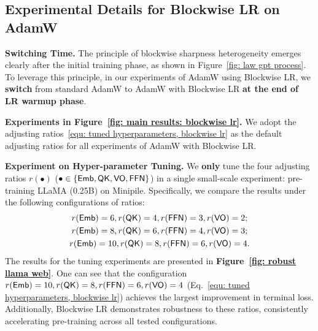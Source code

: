 


\subsection{Experimental Details for Blockwise LR on AdamW}
\label{appendix: experiments, blockwise LR}


{\bf Switching Time.} The principle of blockwise sharpness heterogeneity emerges clearly after the initial training phase, as shown in Figure~\ref{fig: law gpt process}. To leverage this principle, in our experiments of AdamW using Blockwise LR, we {\bf switch} from standard AdamW to AdamW with Blockwise LR {\bf at the end of LR warmup phase}. 


{\bf Experiments in Figure~\ref{fig: main results: blockwise lr}.} We adopt the adjusting ratios~\eqref{equ: tuned hyperparameters, blockwise lr} as the default adjusting ratios for {\bf} all experiments of AdamW with Blockwise LR.


{\bf Experiment on Hyper-parameter Tuning.} We {\bf only} tune the four adjusting ratios $r(\bullet)$ ($\bullet\in\{\textnormal{\textsf{Emb}},\textnormal{\textsf{QK}},\textnormal{\textsf{VO}},\textnormal{\textsf{FFN}}\}$) in a single small-scale experiment: pre-training LLaMA (0.25B) on Minipile. Specifically, we compare the results under the following configurations of ratios:
\begin{gather*}
r(\textnormal{\textsf{Emb}})=6, r(\textnormal{\textsf{QK}})=4, r(\textnormal{\textsf{FFN}})=3, r(\textnormal{\textsf{VO}})=2;\\
r(\textnormal{\textsf{Emb}})=8, r(\textnormal{\textsf{QK}})=6, r(\textnormal{\textsf{FFN}})=4, r(\textnormal{\textsf{VO}})=3;\\
r(\textnormal{\textsf{Emb}})=10, r(\textnormal{\textsf{QK}})=8, r(\textnormal{\textsf{FFN}})=6, r(\textnormal{\textsf{VO}})=4.
\end{gather*}
The results for the tuning experiments are presented in {\bf Figure~\ref{fig: robust llama web}}. One can see that the configuration $r(\textnormal{\textsf{Emb}})=10, r(\textnormal{\textsf{QK}})=8, r(\textnormal{\textsf{FFN}})=6, r(\textnormal{\textsf{VO}})=4$ (Eq.~\eqref{equ: tuned hyperparameters, blockwise lr}) achieves the largest improvement in terminal loss.
Additionally, Blockwise LR demonstrates robustness to these ratios, consistently accelerating pre-training across all tested configurations.

